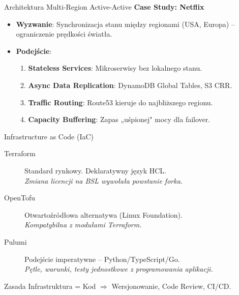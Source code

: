 \documentclass[aspectratio=169]{beamer}
\begin{document}
\begin{frame}{Architektura Multi-Region Active-Active}
    \textbf{Case Study: Netflix}
    \begin{itemize}
        \item \textbf{Wyzwanie}: Synchronizacja stanu między regionami (USA, Europa) – ograniczenie prędkości światła.
        \item \textbf{Podejście}:
        \begin{enumerate}
            \item \textbf{Stateless Services}: Mikroserwisy bez lokalnego stanu.
            \item \textbf{Async Data Replication}: DynamoDB Global Tables, S3 CRR.
            \item \textbf{Traffic Routing}: Route53 kieruje do najbliższego regionu.
            \item \textbf{Capacity Buffering}: Zapas „uśpionej" mocy dla failover.
        \end{enumerate}
    \end{itemize}
\end{frame}

\begin{frame}{Infrastructure as Code (IaC)}
    \begin{description}
        \item[Terraform] Standard rynkowy. Deklaratywny język HCL. \\
            \textit{Zmiana licencji na BSL wywołała powstanie forka.}
        \item[OpenTofu] Otwartoźródłowa alternatywa (Linux Foundation). \\
            \textit{Kompatybilna z modułami Terraform.}
        \item[Pulumi] Podejście imperatywne – Python/TypeScript/Go. \\
            \textit{Pętle, warunki, testy jednostkowe z programowania aplikacji.}
    \end{description}
    \begin{exampleblock}{Zasada}
        Infrastruktura = Kod $\Rightarrow$ Wersjonowanie, Code Review, CI/CD.
    \end{exampleblock}
\end{frame}
\end{document}
